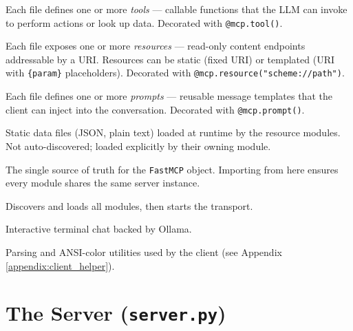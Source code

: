 \documentclass[11pt, a4paper]{article}
\begin{document}
\begin{description}[leftmargin=3em, style=nextline]
  \item[\texttt{tools/}]
    Each file defines one or more \emph{tools} — callable functions that the LLM can invoke to perform actions or look up data. Decorated with \lstinline{@mcp.tool()}.

  \item[\texttt{resources/}]
    Each file exposes one or more \emph{resources} — read-only content endpoints addressable by a URI. Resources can be static (fixed URI) or templated (URI with \texttt{\{param\}} placeholders). Decorated with \lstinline{@mcp.resource("scheme://path")}.

  \item[\texttt{prompts/}]
    Each file defines one or more \emph{prompts} — reusable message templates that the client can inject into the conversation. Decorated with \lstinline{@mcp.prompt()}.

  \item[\texttt{resources/data/}]
    Static data files (JSON, plain text) loaded at runtime by the resource modules. Not auto-discovered; loaded explicitly by their owning module.

  \item[\texttt{mcp\_instance.py}]
    The single source of truth for the \lstinline{FastMCP} object. Importing from here ensures every module shares the same server instance.

  \item[\texttt{server.py}]
    Discovers and loads all modules, then starts the transport.

  \item[\texttt{client.py}]
    Interactive terminal chat backed by Ollama.

  \item[\texttt{client\_helper.py}]
    Parsing and ANSI-color utilities used by the client (see Appendix \ref{appendix:client_helper}).
\end{description}

\section{The Server (\texttt{server.py})}
\end{document}
